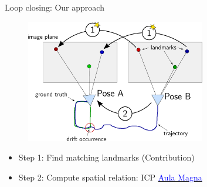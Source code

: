 \documentclass[11pt]{beamer}
\begin{document}

\begin{frame}{Loop closing: Our approach}
\begin{figure}[!htb]
\centering
\includegraphics[width=0.7\textwidth]{figures/approach_loopclosing/loop_closing.pdf}
\end{figure}
\begin{itemize}
\item Step 1: Find matching landmarks (Contribution)
\item Step 2: Compute spatial relation: ICP
\hfill \href{run:/home/n551jw/Documents/presentation_ma/aula_magna.ogv}{\textcolor{blue}{Aula Magna}}
\end{itemize}
\end{frame}

\end{document}
